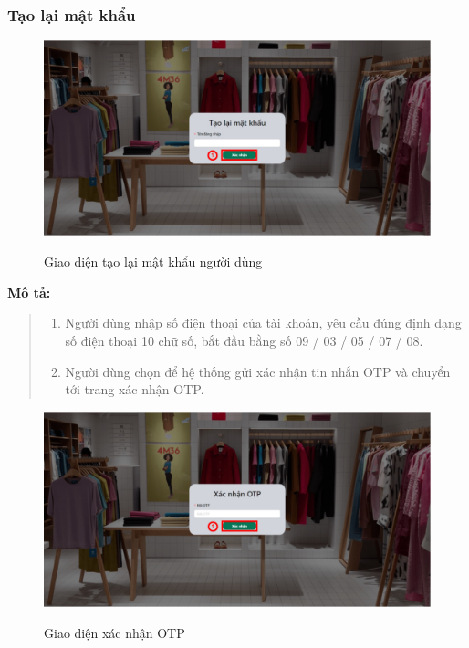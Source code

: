     \subsubsection{Tạo lại mật khẩu}
    \begin{figure}[!htp]
        \centering
        \includegraphics[width=5in]{img/UI/new_customer/reset_password.png}
        \label{3}
        \newline
        \caption{Giao diện tạo lại mật khẩu người dùng}
    \end{figure}
    \textbf{Mô tả:}
    \begin{quote}
        \begin{enumerate}
            \item Người dùng nhập số điện thoại của tài khoản, yêu cầu đúng định dạng số điện thoại 10 chữ số, bắt đầu bằng số 09 / 03 / 05 / 07 / 08.
            \item Người dùng chọn để hệ thống gửi xác nhận tin nhắn OTP và chuyển tới trang xác nhận OTP.
        \end{enumerate}
    \end{quote}
    \newpage
    \begin{figure}[!htp]
        \centering
        \includegraphics[width=5in]{img/UI/new_customer/confirm_otp.png}
        \label{4}
        \newline
        \caption{Giao diện xác nhận OTP}
    \end{figure}
